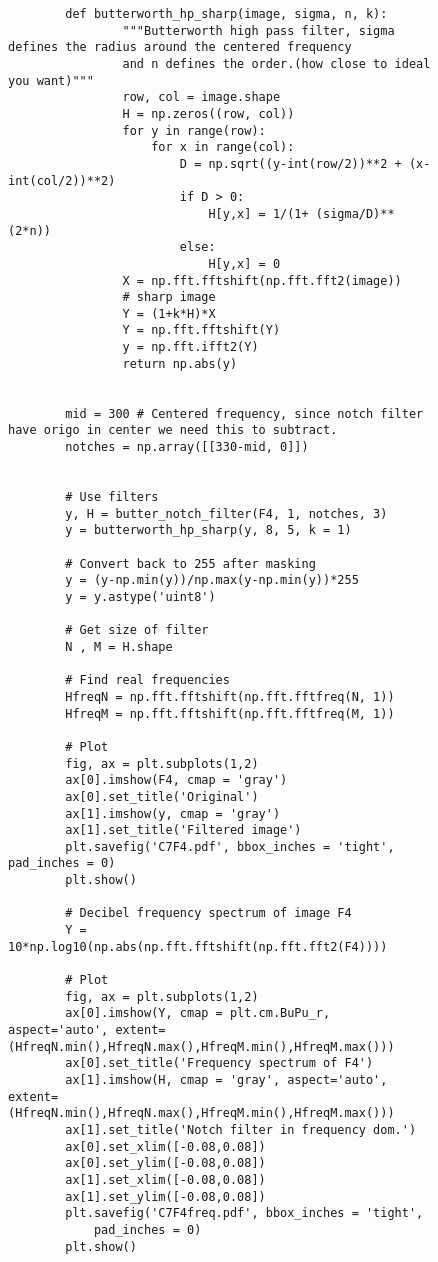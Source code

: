 {\begin{figure}[hbt!]
\begin{lstlisting}
        def butterworth_hp_sharp(image, sigma, n, k):
                """Butterworth high pass filter, sigma defines the radius around the centered frequency
                and n defines the order.(how close to ideal you want)"""
                row, col = image.shape
                H = np.zeros((row, col))
                for y in range(row):
                    for x in range(col):
                        D = np.sqrt((y-int(row/2))**2 + (x-int(col/2))**2)
                        if D > 0:
                            H[y,x] = 1/(1+ (sigma/D)**(2*n))
                        else:
                            H[y,x] = 0
                X = np.fft.fftshift(np.fft.fft2(image))
                # sharp image
                Y = (1+k*H)*X
                Y = np.fft.fftshift(Y)
                y = np.fft.ifft2(Y)
                return np.abs(y)
        
        
        mid = 300 # Centered frequency, since notch filter have origo in center we need this to subtract.
        notches = np.array([[330-mid, 0]])
        
        
        # Use filters
        y, H = butter_notch_filter(F4, 1, notches, 3)
        y = butterworth_hp_sharp(y, 8, 5, k = 1)
        
        # Convert back to 255 after masking
        y = (y-np.min(y))/np.max(y-np.min(y))*255
        y = y.astype('uint8')
        
        # Get size of filter
        N , M = H.shape
        
        # Find real frequencies
        HfreqN = np.fft.fftshift(np.fft.fftfreq(N, 1))
        HfreqM = np.fft.fftshift(np.fft.fftfreq(M, 1))
        
        # Plot
        fig, ax = plt.subplots(1,2)
        ax[0].imshow(F4, cmap = 'gray')
        ax[0].set_title('Original')
        ax[1].imshow(y, cmap = 'gray')
        ax[1].set_title('Filtered image')
        plt.savefig('C7F4.pdf', bbox_inches = 'tight', pad_inches = 0)
        plt.show()
        
        # Decibel frequency spectrum of image F4
        Y = 10*np.log10(np.abs(np.fft.fftshift(np.fft.fft2(F4))))
        
        # Plot
        fig, ax = plt.subplots(1,2)
        ax[0].imshow(Y, cmap = plt.cm.BuPu_r, aspect='auto', extent=(HfreqN.min(),HfreqN.max(),HfreqM.min(),HfreqM.max()))
        ax[0].set_title('Frequency spectrum of F4')
        ax[1].imshow(H, cmap = 'gray', aspect='auto', extent=(HfreqN.min(),HfreqN.max(),HfreqM.min(),HfreqM.max()))
        ax[1].set_title('Notch filter in frequency dom.')
        ax[0].set_xlim([-0.08,0.08])
        ax[0].set_ylim([-0.08,0.08])
        ax[1].set_xlim([-0.08,0.08])
        ax[1].set_ylim([-0.08,0.08])
        plt.savefig('C7F4freq.pdf', bbox_inches = 'tight',
            pad_inches = 0)
        plt.show()
        

\end{lstlisting}
\end{figure}}
